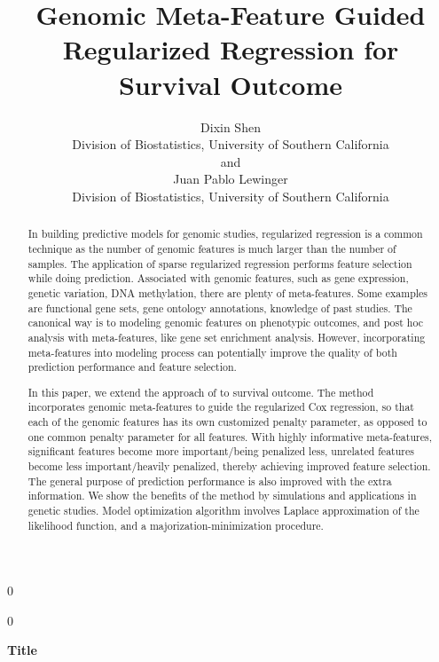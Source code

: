 \documentclass[12pt]{article}
\newcommand{\blind}{0}
\begin{document}
 



\def\spacingset#1{\renewcommand{\baselinestretch}%
{#1}\small\normalsize} \spacingset{1}



\blind
{
  \title{\bf Genomic Meta-Feature Guided Regularized Regression for Survival Outcome}
  \author{Dixin Shen \\
    Division of Biostatistics, University of Southern California\\
    and \\
    Juan Pablo Lewinger \\
    Division of Biostatistics, University of Southern California}
  \maketitle
} \fi

\blind
{
  \bigskip
  \bigskip
  \bigskip
  \begin{center}
    {\LARGE\bf Title}
\end{center}
  \medskip
} \fi

\bigskip
\begin{abstract}
In building predictive models for genomic studies, regularized regression is a common technique as the number of genomic features is much larger than the number of samples. The application of sparse regularized regression performs feature selection while doing prediction. Associated with genomic features, such as gene expression, genetic variation, DNA methylation, there are plenty of meta-features. Some examples are functional gene sets, gene ontology annotations, knowledge of past studies. The canonical way is to modeling genomic features on phenotypic outcomes, and post hoc analysis with meta-features, like gene set enrichment analysis. However, incorporating meta-features into modeling process can potentially improve the quality of both prediction performance and feature selection. 

In this paper, we extend the approach of \cite{10.1093/bioinformatics/btaa776} to survival outcome. The method incorporates genomic meta-features to guide the regularized Cox regression, so that each of the genomic features has its own customized penalty parameter, as opposed to one common penalty parameter for all features. With highly informative meta-features, significant features become more important/being penalized less, unrelated features become less important/heavily penalized, thereby achieving improved feature selection. The general purpose of prediction performance is also improved with the extra information. We show the benefits of the method by simulations and applications in genetic studies. Model optimization algorithm involves Laplace approximation of the likelihood function, and a majorization-minimization procedure. 
\end{abstract}
\end{document}

